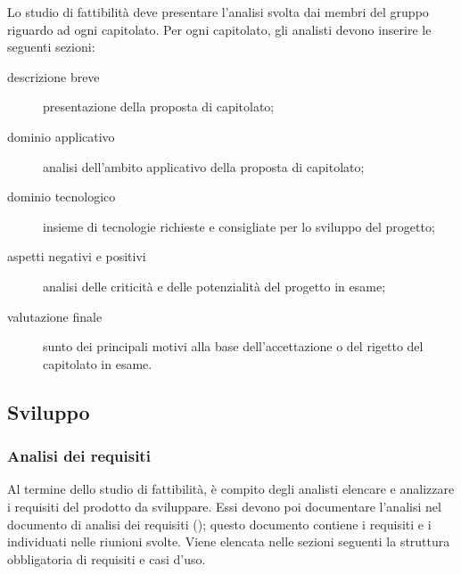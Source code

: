 	Lo studio di fattibilità deve presentare l'analisi svolta dai membri del gruppo riguardo ad ogni capitolato. Per ogni capitolato, gli analisti devono inserire le seguenti sezioni:
	\begin{description}
		\item[descrizione breve] presentazione della proposta di capitolato; 
		\item[dominio applicativo] analisi dell'ambito applicativo della proposta di capitolato; 
		\item[dominio tecnologico] insieme di tecnologie richieste e consigliate per lo sviluppo del progetto;
		\item[aspetti negativi e positivi] analisi delle criticità e delle potenzialità del progetto in esame;
		\item[valutazione finale] sunto dei principali motivi alla base dell'accettazione o del rigetto del capitolato in esame.
	\end{description}

\subsection{Sviluppo}
	\subsubsection{Analisi dei requisiti}
	Al termine dello studio di fattibilità, è compito degli analisti elencare e analizzare i requisiti del prodotto da sviluppare. Essi devono poi documentare l'analisi nel documento di analisi dei requisiti (\AdR); questo documento contiene i requisiti e i  individuati nelle riunioni svolte.
	Viene elencata nelle sezioni seguenti la struttura obbligatoria di requisiti e casi d'uso.
